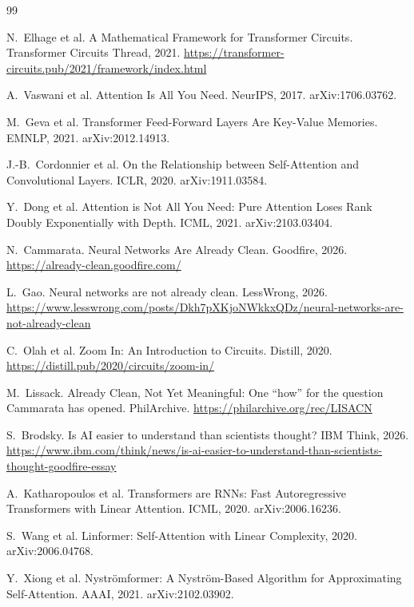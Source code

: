 \begin{thebibliography}{99}

N.~Elhage et al. A Mathematical Framework for Transformer Circuits.
Transformer Circuits Thread, 2021.
\url{https://transformer-circuits.pub/2021/framework/index.html}

A.~Vaswani et al. Attention Is All You Need. NeurIPS, 2017.
arXiv:1706.03762.

M.~Geva et al. Transformer Feed-Forward Layers Are Key-Value Memories.
EMNLP, 2021. arXiv:2012.14913.

J.-B.~Cordonnier et al. On the Relationship between Self-Attention and
Convolutional Layers. ICLR, 2020. arXiv:1911.03584.

Y.~Dong et al. Attention is Not All You Need: Pure Attention Loses Rank
Doubly Exponentially with Depth. ICML, 2021. arXiv:2103.03404.

N.~Cammarata. Neural Networks Are Already Clean. Goodfire, 2026.
\url{https://already-clean.goodfire.com/}

L.~Gao. Neural networks are not already clean. LessWrong, 2026.
\url{https://www.lesswrong.com/posts/Dkh7pXKjoNWkkxQDz/neural-networks-are-not-already-clean}

C.~Olah et al. Zoom In: An Introduction to Circuits. Distill, 2020.
\url{https://distill.pub/2020/circuits/zoom-in/}

M.~Lissack. Already Clean, Not Yet Meaningful: One ``how'' for the
question Cammarata has opened. PhilArchive.
\url{https://philarchive.org/rec/LISACN}

S.~Brodsky. Is AI easier to understand than scientists thought? IBM Think, 2026.
\url{https://www.ibm.com/think/news/is-ai-easier-to-understand-than-scientists-thought-goodfire-essay}

A.~Katharopoulos et al. Transformers are RNNs: Fast Autoregressive
Transformers with Linear Attention. ICML, 2020. arXiv:2006.16236.

S.~Wang et al. Linformer: Self-Attention with Linear Complexity, 2020.
arXiv:2006.04768.

Y.~Xiong et al. Nyströmformer: A Nyström-Based Algorithm for
Approximating Self-Attention. AAAI, 2021. arXiv:2102.03902.


\end{thebibliography}
